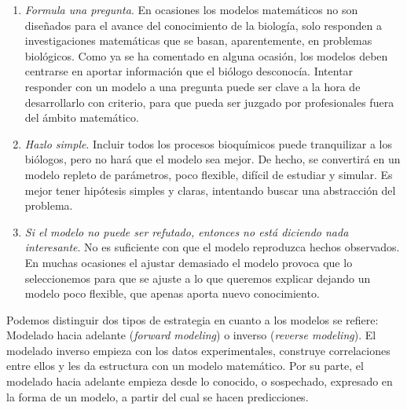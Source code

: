 \begin{enumerate}
	\item \textit{Formula una pregunta}. En ocasiones los modelos matemáticos no son diseñados para el avance del conocimiento de la biología, solo responden a investigaciones matemáticas que se basan, aparentemente, en problemas biológicos. Como ya se ha comentado en alguna ocasión, los modelos deben centrarse en aportar información que el biólogo desconocía. Intentar responder con un modelo a una pregunta puede ser clave a la hora de desarrollarlo con criterio, para que pueda ser juzgado por profesionales fuera del ámbito matemático. 
	
	\item \textit{Hazlo simple}. Incluir todos los procesos bioquímicos puede tranquilizar a los biólogos, pero no hará que el modelo sea mejor. De hecho, se convertirá en un modelo repleto de parámetros, poco flexible, difícil de estudiar y simular. Es mejor tener hipótesis simples y claras, intentando buscar una abstracción del problema.
	
	\item \textit{Si el modelo no puede ser refutado, entonces no está diciendo nada interesante}. No es suficiente con que el modelo reproduzca hechos observados. En muchas ocasiones el ajustar demasiado el modelo provoca que lo seleccionemos para que se ajuste a lo que queremos explicar dejando un modelo poco flexible, que apenas aporta nuevo conocimiento.
\end{enumerate}

Podemos distinguir dos tipos de estrategia en cuanto a los modelos se refiere: Modelado hacia adelante (\textit{forward modeling}) o inverso (\textit{reverse modeling}). El modelado inverso empieza con los datos experimentales, construye correlaciones entre ellos y les da estructura con un modelo matemático. Por su parte, el modelado hacia adelante empieza desde lo conocido, o sospechado, expresado en la forma de un modelo, a partir del cual se hacen predicciones. 


